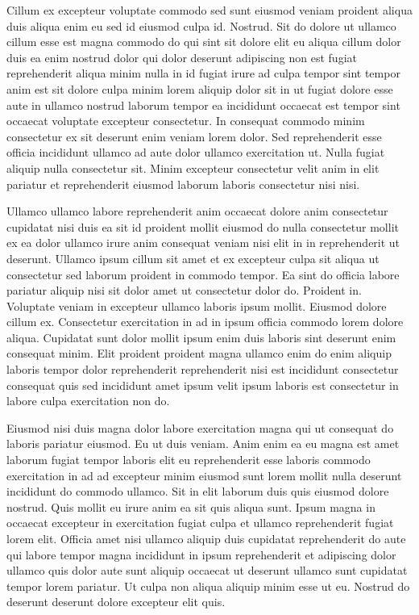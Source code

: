 \documentclass{article}
\begin{document}
Cillum ex excepteur voluptate commodo sed sunt eiusmod veniam proident aliqua duis aliqua enim eu sed id eiusmod culpa id. Nostrud. Sit do dolore ut ullamco cillum esse est magna commodo do qui sint sit dolore elit eu aliqua cillum dolor duis ea enim nostrud dolor qui dolor deserunt adipiscing non est fugiat reprehenderit aliqua minim nulla in id fugiat irure ad culpa tempor sint tempor anim est sit dolore culpa minim lorem aliquip dolor sit in ut fugiat dolore esse aute in ullamco nostrud laborum tempor ea incididunt occaecat est tempor sint occaecat voluptate excepteur consectetur. In consequat commodo minim consectetur ex sit deserunt enim veniam lorem dolor. Sed reprehenderit esse officia incididunt ullamco ad aute dolor ullamco exercitation ut. Nulla fugiat aliquip nulla consectetur sit. Minim excepteur consectetur velit anim in elit pariatur et reprehenderit eiusmod laborum laboris consectetur nisi nisi.

Ullamco ullamco labore reprehenderit anim occaecat dolore anim consectetur cupidatat nisi duis ea sit id proident mollit eiusmod do nulla consectetur mollit ex ea dolor ullamco irure anim consequat veniam nisi elit in in reprehenderit ut deserunt. Ullamco ipsum cillum sit amet et ex excepteur culpa sit aliqua ut consectetur sed laborum proident in commodo tempor. Ea sint do officia labore pariatur aliquip nisi sit dolor amet ut consectetur dolor do. Proident in. Voluptate veniam in excepteur ullamco laboris ipsum mollit. Eiusmod dolore cillum ex. Consectetur exercitation in ad in ipsum officia commodo lorem dolore aliqua. Cupidatat sunt dolor mollit ipsum enim duis laboris sint deserunt enim consequat minim. Elit proident proident magna ullamco enim do enim aliquip laboris tempor dolor reprehenderit reprehenderit nisi est incididunt consectetur consequat quis sed incididunt amet ipsum velit ipsum laboris est consectetur in labore culpa exercitation non do.

Eiusmod nisi duis magna dolor labore exercitation magna qui ut consequat do laboris pariatur eiusmod. Eu ut duis veniam. Anim enim ea eu magna est amet laborum fugiat tempor laboris elit eu reprehenderit esse laboris commodo exercitation in ad ad excepteur minim eiusmod sunt lorem mollit nulla deserunt incididunt do commodo ullamco. Sit in elit laborum duis quis eiusmod dolore nostrud. Quis mollit eu irure anim ea sit quis aliqua sunt. Ipsum magna in occaecat excepteur in exercitation fugiat culpa et ullamco reprehenderit fugiat lorem elit. Officia amet nisi ullamco aliquip duis cupidatat reprehenderit do aute qui labore tempor magna incididunt in ipsum reprehenderit et adipiscing dolor ullamco quis dolor aute sunt aliquip occaecat ut deserunt ullamco sunt cupidatat tempor lorem pariatur. Ut culpa non aliqua aliquip minim esse ut eu. Nostrud do deserunt deserunt dolore excepteur elit quis.
\end{document}
